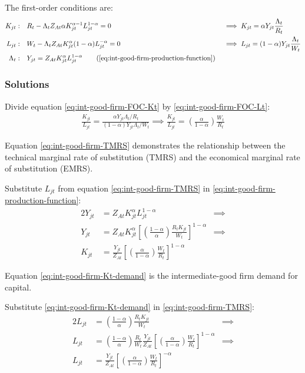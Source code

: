 \documentclass[
	thesis.tex
	]{subfiles}
\begin{document}
The first-order conditions are:
\begin{alignat}{2}
	K_{jt}: \quad & R_t - \Lambda_t Z_{At} \alpha K_{jt}^{\alpha-1} L_{jt}^{1-\alpha} = 0 &&\implies K_{jt} = \alpha Y_{jt} \frac{\Lambda_t}{R_t} \label{eq:int-good-firm-FOC-Kt} \\
	L_{jt}: \quad & W_t - \Lambda_t Z_{At} K_{jt}^\alpha (1-\alpha) L_{jt}^{-\alpha} = 0 \quad &&\implies L_{jt} = (1-\alpha) Y_{jt} \frac{\Lambda_t}{W_t} \label{eq:int-good-firm-FOC-Lt} \\
	\Lambda_t: \quad & Y_{jt} = Z_{At} K_{jt}^\alpha L_{jt}^{1-\alpha} \tag{\ref{eq:int-good-firm-production-function}}
\end{alignat}

\subsubsection*{Solutions}

Divide equation \ref{eq:int-good-firm-FOC-Kt} by \ref{eq:int-good-firm-FOC-Lt}:
\begin{align}
	\frac{K_{jt}}{L_{jt}} = \frac{\alpha Y_{jt} \Lambda_t /R_t}{(1-\alpha) Y_{jt} \Lambda_t /W_t} \implies
	\frac{K_{jt}}{L_{jt}} = \left( \frac{\alpha}{1-\alpha} \right) \frac{W_t}{R_t} \label{eq:int-good-firm-TMRS}
\end{align}

Equation \ref{eq:int-good-firm-TMRS} demonstrates the relationship between the technical marginal rate of substitution (TMRS) and the economical marginal rate of substitution (EMRS). 

Substitute $L_{jt}$ from equation \ref{eq:int-good-firm-TMRS} in \ref{eq:int-good-firm-production-function}:
\begin{alignat}{2}
	Y_{jt} & = Z_{At} K_{jt}^\alpha L_{jt}^{1-\alpha} &\implies \nonumber \\
	Y_{jt} & = Z_{At} K_{jt}^\alpha \left[ \left( \frac{1-\alpha}{\alpha} \right) \frac{R_t K_{jt}}{W_t} \right]^{1-\alpha} &\implies \nonumber \\
	K_{jt} & = \frac{Y_{jt}}{Z_{At}} \left[ \left( \frac{\alpha}{1-\alpha} \right) \frac{W_t}{R_t}\right]^{1-\alpha} \label{eq:int-good-firm-Kt-demand}
\end{alignat}

Equation \ref{eq:int-good-firm-Kt-demand} is the intermediate-good firm demand for capital. 

Substitute \ref{eq:int-good-firm-Kt-demand} in \ref{eq:int-good-firm-TMRS}:
\begin{alignat}{2}
	L_{jt} & = \left( \frac{1-\alpha}{\alpha} \right) \frac{R_t K_{jt}}{W_t} &\implies \nonumber \\
	L_{jt} & = \left( \frac{1-\alpha}{\alpha} \right) \frac{R_t}{W_t} \frac{Y_{jt}}{Z_{At}} \left[ \left( \frac{\alpha}{1-\alpha} \right) \frac{W_t}{R_t}\right]^{1-\alpha} &\implies \nonumber \\
	L_{jt} & = \frac{Y_{jt}}{Z_{At}} \left[ \left( \frac{\alpha}{1-\alpha} \right) \frac{W_t}{R_t}\right]^{-\alpha} \label{eq:int-good-firm-Lt-demand}
\end{alignat}
\end{document}
